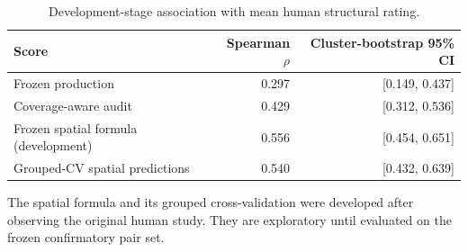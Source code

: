 \begin{table}[t]
\caption{Development-stage association with mean human structural rating.}
\label{tab:spatial-score-development}
\centering
\begin{tabular}{lrr}
\toprule
Score & Spearman $\rho$ & Cluster-bootstrap 95\% CI \\
\midrule
Frozen production & 0.297 & [0.149, 0.437] \\
Coverage-aware audit & 0.429 & [0.312, 0.536] \\
Frozen spatial formula (development) & 0.556 & [0.454, 0.651] \\
Grouped-CV spatial predictions & 0.540 & [0.432, 0.639] \\
\bottomrule
\end{tabular}
\begin{minipage}{0.96\columnwidth}\footnotesize
The spatial formula and its grouped cross-validation were developed after observing the original human study. They are exploratory until evaluated on the frozen confirmatory pair set.
\end{minipage}
\end{table}
